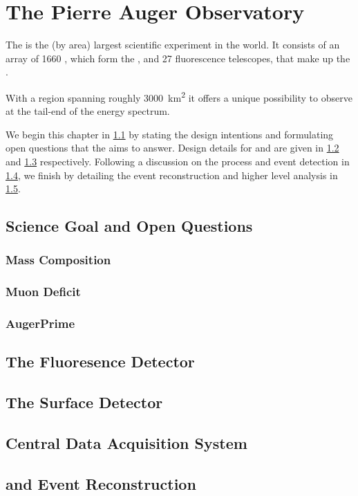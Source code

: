 
\chapter{The Pierre Auger Observatory}
\label{chap:pierre-auger-observatory}

The \PAO is the (by area) largest scientific experiment in the world. It 
consists of an array of 1660 \WCDs, which form the \SD, and 27 fluorescence 
telescopes, that make up the \FD.

With a region spanning roughly \SI{3000}{\kilo\meter\squared} it offers a unique
possibility to observe \UHECRs at the tail-end of the \CR energy spectrum. 

We begin this chapter in \cref{sec:science-case} by stating the design 
intentions and formulating open questions that the \PAO aims to answer. Design
details for \FD and \SD are given in \cref{sec:fd} and \cref{sec:sd} 
respectively. Following a discussion on the \DAQ process and event detection in 
\cref{sec:cdas}, we finish by detailing the event reconstruction and higher 
level analysis in \cref{sec:rec}.


\section{Science Goal and Open Questions}
\label{sec:science-case}

\subsection{Mass Composition}

\subsection{Muon Deficit}

\subsection{AugerPrime}


\section{The Fluoresence Detector}
\label{sec:fd}

\blindtext

\section{The Surface Detector}
\label{sec:sd}

\blindtext

\section{Central Data Acquisition System}
\label{sec:cdas}

\blindtext

\section{\Offline and Event Reconstruction}
\label{sec:rec}

\blindtext
